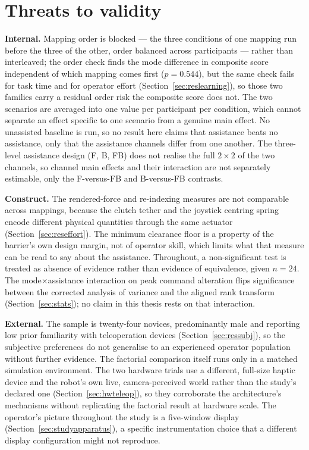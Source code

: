\section{Threats to validity}
\label{sec:discussion-threats}

\textbf{Internal.} Mapping order is blocked --- the three conditions of one mapping run before the three of the other, order balanced across participants --- rather than interleaved; the order check finds the mode difference in composite score independent of which mapping comes first ($p = 0.544$), but the same check fails for task time and for operator effort (Section~\ref{sec:reslearning}), so those two families carry a residual order risk the composite score does not. The two scenarios are averaged into one value per participant per condition, which cannot separate an effect specific to one scenario from a genuine main effect. No unassisted baseline is run, so no result here claims that assistance beats no assistance, only that the assistance channels differ from one another. The three-level assistance design (F, B, FB) does not realise the full $2\times2$ of the two channels, so channel main effects and their interaction are not separately estimable, only the F-versus-FB and B-versus-FB contrasts.

\textbf{Construct.} The rendered-force and re-indexing measures are not comparable across mappings, because the clutch tether and the joystick centring spring encode different physical quantities through the same actuator (Section~\ref{sec:reseffort}). The minimum clearance floor is a property of the barrier's own design margin, not of operator skill, which limits what that measure can be read to say about the assistance. Throughout, a non-significant test is treated as absence of evidence rather than evidence of equivalence, given $n=24$. The mode$\times$assistance interaction on peak command alteration flips significance between the corrected analysis of variance and the aligned rank transform (Section~\ref{sec:stats}); no claim in this thesis rests on that interaction.

\textbf{External.} The sample is twenty-four novices, predominantly male and reporting low prior familiarity with teleoperation devices (Section~\ref{sec:ressubj}), so the subjective preferences do not generalise to an experienced operator population without further evidence. The factorial comparison itself runs only in a matched simulation environment. The two hardware trials use a different, full-size haptic device and the robot's own live, camera-perceived world rather than the study's declared one (Section~\ref{sec:hwteleop}), so they corroborate the architecture's mechanisms without replicating the factorial result at hardware scale. The operator's picture throughout the study is a five-window display (Section~\ref{sec:studyapparatus}), a specific instrumentation choice that a different display configuration might not reproduce.

